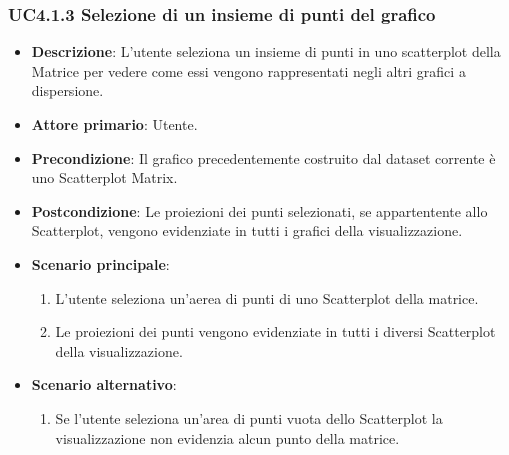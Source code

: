 \subsubsection{UC4.1.3 Selezione di un insieme di punti del grafico}
\label{subsec:uc4.1.1}
\begin{itemize}
    \item \textbf{Descrizione}: L'utente seleziona un insieme di punti in uno scatterplot della Matrice per vedere come 
                                essi vengono rappresentati negli altri grafici a dispersione.
	
    \item \textbf{Attore primario}: Utente.
    
    \item \textbf{Precondizione}:   Il grafico precedentemente costruito dal dataset corrente è uno Scatterplot Matrix.
    \item \textbf{Postcondizione}:  Le proiezioni dei punti selezionati, se appartentente allo Scatterplot, 
                                    vengono evidenziate in tutti i grafici della visualizzazione.

	\item \textbf{Scenario principale}:
        \begin{enumerate}
            \item L'utente seleziona un'aerea di punti di uno Scatterplot della matrice.
            \item Le proiezioni dei punti vengono evidenziate in tutti i diversi Scatterplot della visualizzazione.
        \end{enumerate}

    \item \textbf{Scenario alternativo}:
        \begin{enumerate}
            \item Se l'utente seleziona un'area di punti vuota dello Scatterplot la visualizzazione non evidenzia alcun punto della matrice.
        \end{enumerate}

\end{itemize}





